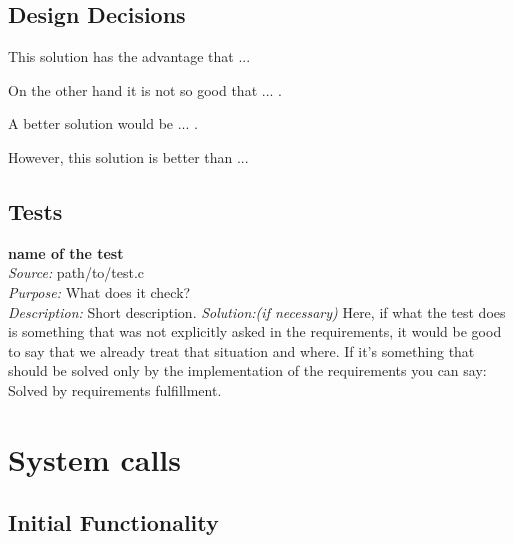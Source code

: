 

    \subsection{Design Decisions}

	This solution has the advantage that ... 

	On the other hand it is not so good that ... . 

	A better solution would be ... . 

	However, this solution is better than ...

    \subsection{Tests}

    \textbf{name of the test}\\
    \textit{Source:} path/to/test.c\\
    \textit{Purpose:} What does it check?\\
    \textit{Description:} Short description.
    \textit{Solution:(if necessary)} Here, if what the test does is something that was not explicitly asked in the requirements, it would be good to say that we already treat that situation and where. If it's something that should be solved only by the implementation of the requirements you can say: Solved by requirements fulfillment.
    
\section{System calls}

    \subsection{Initial Functionality}


